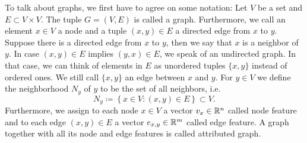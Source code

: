 To talk about graphs, we first have to agree on some notation: Let $V$ be a set and $E\subset V\times V$. The tuple $G=(V,E)$ is called a graph. Furthermore, we call an element $x\in V$ a node and a tuple 
$(x, y)\in E$ a directed edge from $x$ to $y$. Suppose there is a directed edge from $x$ to $y$, then we say that $x$ is a neighbor of $y$. 
In case $(x,y)\in E$ implies $(y,x)\in E$, we speak of an undirected graph.
In that case, we can think of elements in $E$ as unordered tuples $\{x,y\}$ instead of ordered ones. We still call $\{x,y\}$ an edge between $x$ and $y$.
For $y\in V$ we define the neighborhood $N_y$ of $y$ to be the set of all neighbors, i.e.
\begin{equation}
    \label{eq:def_neighbors}
    N_y\coloneq\left\{x\in V : (x,y)\in E\right\}\subset V.
\end{equation}
Furthermore, we assign to each node $x\in V$ a vector $v_x\in\mathbb{R}^n$ called node feature and to each edge $(x, y)\in E$ a vector $e_{x,y}\in\mathbb{R}^m$ called edge feature.
A graph together with all its node and edge features is called attributed graph. 

